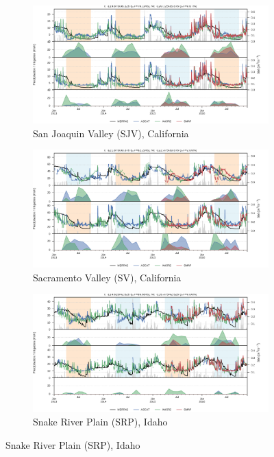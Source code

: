 \documentclass[hess, manuscript]{copernicus}
\begin{document}
\begin{figure}
   \centering
   \begin{subfigure}[t]{0.7\textwidth}
       \centering
       \includegraphics[width=\textwidth]{figures/results/California_Central_Valley}
       \caption{San Joaquin Valley (SJV), California}
       \label{fig:timeseries-SJV}
   \end{subfigure}
   \hfill
   \begin{subfigure}[t]{0.7\textwidth}
       \centering
       \includegraphics[width=\textwidth]{figures/results/California_Sacramento_Valley}
       \caption{Sacramento Valley (SV), California}
       \label{fig:timeseries-SV}
   \end{subfigure}
   \hfill
   \begin{subfigure}[t]{0.7\textwidth}
       \centering
       \includegraphics[width=\textwidth]{figures/results/Idaho}
       \caption{Snake River Plain (SRP), Idaho}
       \label{fig:timeseries-SRP}
   \end{subfigure}
\end{figure}
\end{document}
